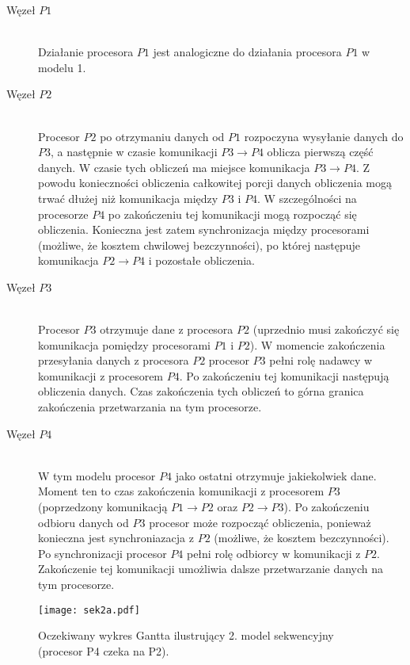 \begin{description}

\item[Węzeł $P1$] \hfill \\

Działanie procesora $P1$ jest analogiczne do działania procesora $P1$ w modelu 1.

\item[Węzeł $P2$] \hfill \\

Procesor $P2$ po otrzymaniu danych od $P1$ rozpoczyna wysyłanie danych do $P3$, a następnie w czasie komunikacji $P3 \to P4$ oblicza pierwszą część danych.
W czasie tych obliczeń ma miejsce komunikacja $P3 \to P4$. Z powodu konieczności obliczenia całkowitej porcji danych obliczenia mogą trwać dłużej niż komunikacja
między $P3$ i $P4$. W szczególności na procesorze $P4$ po zakończeniu tej komunikacji mogą rozpocząć się obliczenia.
Konieczna jest zatem synchronizacja między procesorami (możliwe, że kosztem chwilowej bezczynności), po której następuje komunikacja $P2 \to P4$ i pozostałe obliczenia.

\item[Węzeł $P3$] \hfill \\

Procesor $P3$ otrzymuje dane z procesora $P2$ (uprzednio musi zakończyć się komunikacja pomiędzy procesorami $P1$ i $P2$).
W momencie zakończenia przesyłania danych z procesora $P2$ procesor $P3$ pełni rolę nadawcy w komunikacji z procesorem $P4$.
Po zakończeniu tej komunikacji następują obliczenia danych. Czas zakończenia tych obliczeń to górna granica zakończenia przetwarzania na tym procesorze.

\item[Węzeł $P4$] \hfill \\

W tym modelu procesor $P4$ jako ostatni otrzymuje jakiekolwiek dane. Moment ten to czas zakończenia komunikacji z procesorem $P3$ (poprzedzony komunikacją $P1 \to P2$ oraz $P2 \to P3$). Po zakończeniu odbioru danych od $P3$ procesor może rozpocząć obliczenia, ponieważ konieczna jest synchroniazacja z $P2$ (możliwe, że kosztem bezczynności). Po synchronizacji procesor $P4$ pełni rolę odbiorcy w komunikacji z $P2$. Zakończenie tej komunikacji umożliwia dalsze przetwarzanie danych na tym procesorze.

\end{description}

\begin{figure}[H]
\centering
\texttt{[image: sek2a.pdf]}
\caption{Oczekiwany wykres Gantta ilustrujący 2. model sekwencyjny (procesor P4 czeka na P2).}
\label{fig:seq2a}
\end{figure}


